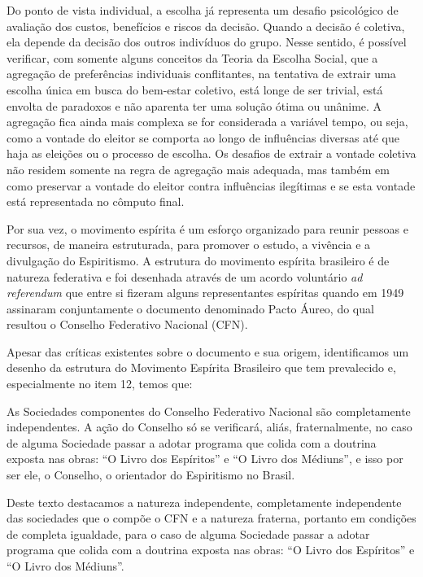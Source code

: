 \begin{citacao}
	Do ponto de vista individual, a escolha já representa um desafio psicológico de avaliação dos custos, benefícios e riscos da decisão. Quando a decisão é coletiva, ela depende da decisão dos outros indivíduos do grupo. Nesse sentido, é possível verificar, com somente alguns conceitos da Teoria da Escolha Social, que a agregação de preferências individuais conflitantes, na tentativa de extrair uma escolha única em busca do bem-estar coletivo, está longe de ser trivial, está envolta de paradoxos e não aparenta ter uma solução ótima ou unânime. A agregação fica ainda mais complexa se for considerada a variável tempo, ou seja, como a vontade do eleitor se comporta ao longo de influências diversas até que haja as eleições ou o processo de escolha. Os desafios de extrair a vontade coletiva não residem somente na regra de agregação mais adequada, mas também em como preservar a vontade do eleitor contra influências ilegítimas e se esta vontade está representada no cômputo final.
\end{citacao}



Por sua vez, o movimento espírita é um esforço organizado para reunir pessoas e recursos, de maneira estruturada, para promover o estudo, a vivência e a divulgação do Espiritismo. A estrutura do movimento espírita brasileiro é de natureza federativa e foi desenhada através de um acordo voluntário \textit{ad referendum} que entre si fizeram alguns representantes espíritas quando em 1949 assinaram conjuntamente o documento denominado Pacto Áureo, do qual resultou o Conselho Federativo Nacional (CFN). 

Apesar das críticas existentes sobre o documento e sua origem, identificamos um desenho da estrutura do Movimento Espírita Brasileiro que tem prevalecido e, especialmente no item 12, temos que:


\begin{citacao}
As Sociedades componentes do Conselho Federativo Nacional são completamente independentes. A ação do Conselho só se verificará, aliás, fraternalmente, no caso de alguma Sociedade passar a adotar programa que colida com a doutrina exposta nas obras: “O Livro dos Espíritos” e “O Livro dos Médiuns”, e isso por ser ele, o Conselho, o orientador do Espiritismo no Brasil.
\end{citacao}

Deste texto destacamos a natureza independente, completamente independente das sociedades que o compõe o CFN e a natureza fraterna, portanto em condições de completa igualdade, para o caso de alguma Sociedade passar a adotar programa que colida com a doutrina exposta nas obras: “O Livro dos Espíritos” e “O Livro dos Médiuns”.

